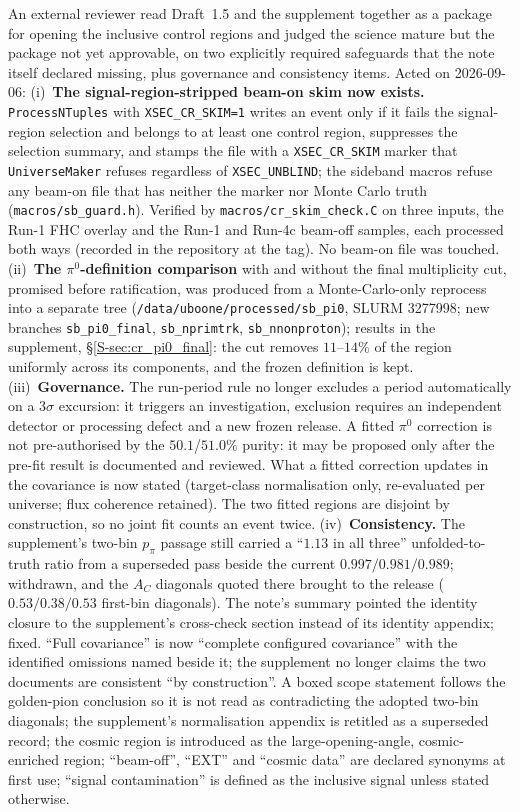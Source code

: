 An external reviewer read Draft~1.5 and the supplement together as a package for opening
the inclusive control regions and judged the science mature but the package not yet
approvable, on two explicitly required safeguards that the note itself declared missing,
plus governance and consistency items. Acted on 2026-09-06:
(i)~\textbf{The signal-region-stripped beam-on skim now exists.} \texttt{ProcessNTuples}
with \texttt{XSEC\_CR\_SKIM=1} writes an event only if it fails the signal-region
selection and belongs to at least one control region, suppresses the selection summary,
and stamps the file with a \texttt{XSEC\_CR\_SKIM} marker that \texttt{UniverseMaker}
refuses regardless of \texttt{XSEC\_UNBLIND}; the sideband macros refuse any beam-on
file that has neither the marker nor Monte Carlo truth (\texttt{macros/sb\_guard.h}).
Verified by \texttt{macros/cr\_skim\_check.C} on three inputs, the Run-1 FHC overlay and
the Run-1 and Run-4c beam-off samples, each
processed both ways (recorded in the repository at the tag). No beam-on file was touched.
(ii)~\textbf{The $\pi^0$-definition comparison} with and without the final multiplicity
cut, promised before ratification, was produced from a Monte-Carlo-only reprocess into a
separate tree (\texttt{/data/uboone/processed/sb\_pi0}, SLURM 3277998; new branches
\texttt{sb\_pi0\_final}, \texttt{sb\_nprimtrk}, \texttt{sb\_nnonproton}); results in the
supplement, \S\ref{S-sec:cr_pi0_final}: the cut removes $11$--$14\%$ of the region uniformly across its
components, and the frozen definition is kept.
(iii)~\textbf{Governance.} The run-period rule no longer excludes a period automatically
on a $3\sigma$ excursion: it triggers an investigation, exclusion requires an independent
detector or processing defect and a new frozen release. A fitted $\pi^0$ correction is not
pre-authorised by the $50.1$/$51.0\%$ purity: it may be proposed only after the pre-fit
result is documented and reviewed. What a fitted correction updates in the covariance is
now stated (target-class normalisation only, re-evaluated per universe; flux coherence
retained). The two fitted regions are disjoint by construction, so no joint fit counts an
event twice.
(iv)~\textbf{Consistency.} The supplement's two-bin $p_\pi$ passage still carried a
``$1.13$ in all three'' unfolded-to-truth ratio from a superseded pass beside the current
$0.997/0.981/0.989$; withdrawn, and the $A_C$ diagonals quoted there brought to the
release ($0.53/0.38/0.53$ first-bin diagonals). The note's summary pointed the identity
closure to the supplement's cross-check section instead of its identity appendix; fixed.
``Full covariance'' is now ``complete configured covariance'' with the identified
omissions named beside it; the supplement no longer claims the two documents are
consistent ``by construction''. A boxed scope statement follows the golden-pion
conclusion so it is not read as contradicting the adopted two-bin diagonals; the
supplement's normalisation appendix is retitled as a superseded record; the cosmic region
is introduced as the large-opening-angle, cosmic-enriched region; ``beam-off'', ``EXT''
and ``cosmic data'' are declared synonyms at first use; ``signal contamination'' is
defined as the inclusive signal unless stated otherwise.

